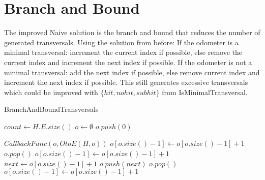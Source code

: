\chapter{Branch and Bound}
The improved Naive solution is the branch and bound that reduces the number of generated transversals. Using the solution from before: If the odometer is a minimal transversal: increment the current index if possible, else remove the current index and increment the next index if possible. If the odometer is not a minimal transversal: add the next index if possible, else remove current index and increment the next index if possible. This still generates excessive transversals which could be improved with $\{hit,nohit,subhit\}$ from IsMinimalTransversal.
\begin{algorithm}
	\caption{BranchAndBoundTransversals}\label{BranchAndBoundTransversals}
	\begin{algorithmic}[1]
		\State $count \gets H.E.size()$
		\State $o \gets \emptyset$
		\State $o.push(0)$
		 {}
		
		\State $CallbackFunc(o,OtoE(H,o))$
		\State $o[o.size()-1] \gets o[o.size()-1] +1$
		\Else
		\State $o.pop()$
		\State $o[o.size()-1] \gets o[o.size()-1] +1 $
		\EndIf
		\EndIf
		\Else
		\State $next \gets o[o.size()-1] + 1$
		\State $o.push(next)$
		\Else
		\State $o.pop()$
		\State $o[o.size()-1] \gets o[o.size()-1] +1 $
		\EndIf
		\EndIf
		\EndIf
		\EndWhile
		\EndFunction
	\end{algorithmic}
\end{algorithm}